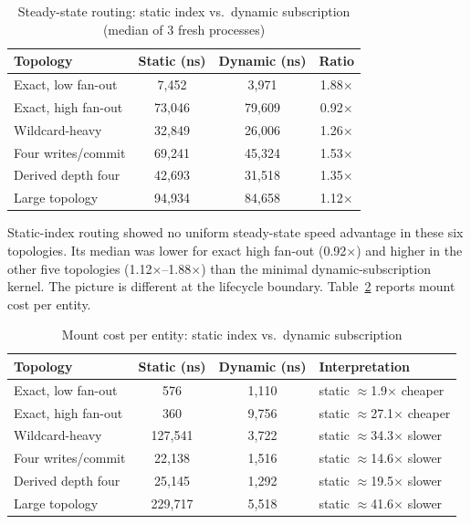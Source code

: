 \documentclass[conference]{IEEEtran}
\begin{document}
\begin{table}[h]
\centering
\caption{Steady-state routing: static index vs.\ dynamic subscription (median of 3 fresh processes)}
\label{tab:routing}
\footnotesize
\begin{tabular}{@{}lccc@{}}
\toprule
\textbf{Topology} & Static (ns) & Dynamic (ns) & Ratio \\
\midrule
Exact, low fan-out & 7{,}452 & 3{,}971 & 1.88$\times$ \\
Exact, high fan-out & 73{,}046 & 79{,}609 & 0.92$\times$ \\
Wildcard-heavy & 32{,}849 & 26{,}006 & 1.26$\times$ \\
Four writes/commit & 69{,}241 & 45{,}324 & 1.53$\times$ \\
Derived depth four & 42{,}693 & 31{,}518 & 1.35$\times$ \\
Large topology & 94{,}934 & 84{,}658 & 1.12$\times$ \\
\bottomrule
\end{tabular}
\end{table}

Static-index routing showed no uniform steady-state speed advantage in these
six topologies. Its median was lower for exact high fan-out (0.92$\times$)
and higher in the other five topologies (1.12$\times$--1.88$\times$) than the
minimal dynamic-subscription kernel. The picture is different at the lifecycle
boundary. Table~\ref{tab:lifecycle} reports mount cost per entity.

\begin{table}[h]
\centering
\caption{Mount cost per entity: static index vs.\ dynamic subscription}
\label{tab:lifecycle}
\footnotesize
\begin{tabular}{@{}lccl@{}}
\toprule
\textbf{Topology} & Static (ns) & Dynamic (ns) & Interpretation \\
\midrule
Exact, low fan-out & 576 & 1{,}110 & static $\approx$1.9$\times$ cheaper \\
Exact, high fan-out & 360 & 9{,}756 & static $\approx$27.1$\times$ cheaper \\
Wildcard-heavy & 127{,}541 & 3{,}722 & static $\approx$34.3$\times$ slower \\
Four writes/commit & 22{,}138 & 1{,}516 & static $\approx$14.6$\times$ slower \\
Derived depth four & 25{,}145 & 1{,}292 & static $\approx$19.5$\times$ slower \\
Large topology & 229{,}717 & 5{,}518 & static $\approx$41.6$\times$ slower \\
\bottomrule
\end{tabular}
\end{table}
\end{document}
